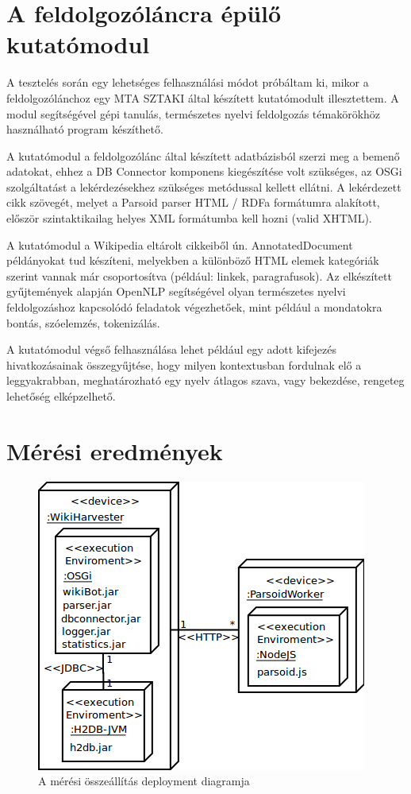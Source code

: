 
\section{A feldolgozóláncra épülő kutatómodul}
\label{sec:researchbundle}

A tesztelés során egy lehetséges felhasználási módot próbáltam ki, mikor a feldolgozólánchoz egy MTA SZTAKI által készített kutatómodult illesztettem. A modul segítségével gépi tanulás, természetes nyelvi feldolgozás témakörökhöz használható program készíthető.

A kutatómodul a feldolgozólánc által készített adatbázisból szerzi meg a bemenő adatokat, ehhez a DB Connector komponens kiegészítése volt szükséges, az OSGi szolgáltatást a lekérdezésekhez szükséges metódussal kellett ellátni. A lekérdezett cikk szövegét, melyet a Parsoid parser HTML / RDFa formátumra alakított, először szintaktikailag helyes XML formátumba kell hozni (valid XHTML).

A kutatómodul a Wikipedia eltárolt cikkeiből ún. AnnotatedDocument példányokat tud készíteni, melyekben a különböző HTML elemek kategóriák szerint vannak már csoportosítva (például: linkek, paragrafusok). Az elkészített gyűjtemények alapján OpenNLP segítségével olyan természetes nyelvi feldolgozáshoz kapcsolódó feladatok végezhetőek, mint például a mondatokra bontás, szóelemzés, tokenizálás.

A kutatómodul végső felhasználása lehet például egy adott kifejezés hivatkozásainak összegyűjtése, hogy milyen kontextusban fordulnak elő a leggyakrabban, meghatározható egy nyelv átlagos szava, vagy bekezdése, rengeteg lehetőség elképzelhető.


\section{Mérési eredmények}
\label{sec:measurement}

\begin{figure}[htp]
\centering
\includegraphics[scale=0.5]{img/deploymentdiagram}
\caption{A mérési összeállítás deployment diagramja}
\label{fig:deploymentdiagram}
\end{figure}

